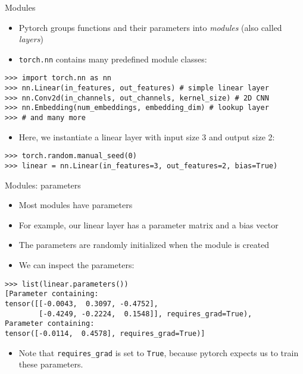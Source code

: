\begin{vbframe}{Modules}
\vfill
\begin{itemize}
\item Pytorch groups functions and their parameters into \textit{modules} (also called \textit{layers})
\item \texttt{torch.nn} contains many predefined module classes:
\end{itemize}
\begin{verbatim}
>>> import torch.nn as nn
>>> nn.Linear(in_features, out_features) # simple linear layer
>>> nn.Conv2d(in_channels, out_channels, kernel_size) # 2D CNN
>>> nn.Embedding(num_embeddings, embedding_dim) # lookup layer
>>> # and many more
\end{verbatim}
\begin{itemize}
\item Here, we instantiate a linear layer with input size 3 and output size 2:
\end{itemize}
\begin{verbatim}
>>> torch.random.manual_seed(0)
>>> linear = nn.Linear(in_features=3, out_features=2, bias=True)
\end{verbatim}
\end{vbframe}
	
\begin{vbframe}{Modules: parameters}
\begin{itemize}
\item Most modules have parameters
\item For example, our linear layer has a parameter matrix and a bias vector
\item The parameters are randomly initialized when the module is created
\item We can inspect the parameters:
\end{itemize}
\begin{verbatim}
>>> list(linear.parameters())
[Parameter containing:
tensor([[-0.0043,  0.3097, -0.4752],
		[-0.4249, -0.2224,  0.1548]], requires_grad=True), 
Parameter containing:
tensor([-0.0114,  0.4578], requires_grad=True)]
\end{verbatim}
\begin{itemize}
\item Note that \texttt{requires\_grad} is set to \texttt{True}, because pytorch expects us to train these parameters.
\end{itemize}
\end{vbframe}
	
